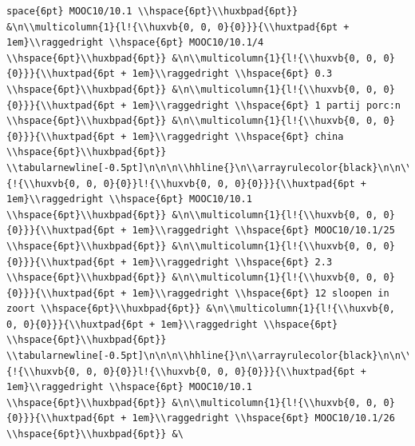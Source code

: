 \documentclass[11pt,preprint, authoryear]{elsarticle}
\numberwithin{equation}{section}
\numberwithin{figure}{section}
\numberwithin{table}{section}
\begin{document}
\begin{verbatim}
space{6pt} MOOC10/10.1 \\hspace{6pt}\\huxbpad{6pt}} &\n\\multicolumn{1}{l!{\\huxvb{0, 0, 0}{0}}}{\\huxtpad{6pt + 1em}\\raggedright \\hspace{6pt} MOOC10/10.1/4 \\hspace{6pt}\\huxbpad{6pt}} &\n\\multicolumn{1}{l!{\\huxvb{0, 0, 0}{0}}}{\\huxtpad{6pt + 1em}\\raggedright \\hspace{6pt} 0.3 \\hspace{6pt}\\huxbpad{6pt}} &\n\\multicolumn{1}{l!{\\huxvb{0, 0, 0}{0}}}{\\huxtpad{6pt + 1em}\\raggedright \\hspace{6pt} 1 partij porc:n \\hspace{6pt}\\huxbpad{6pt}} &\n\\multicolumn{1}{l!{\\huxvb{0, 0, 0}{0}}}{\\huxtpad{6pt + 1em}\\raggedright \\hspace{6pt} china \\hspace{6pt}\\huxbpad{6pt}} \\tabularnewline[-0.5pt]\n\n\n\\hhline{}\n\\arrayrulecolor{black}\n\n\\multicolumn{1}{!{\\huxvb{0, 0, 0}{0}}l!{\\huxvb{0, 0, 0}{0}}}{\\huxtpad{6pt + 1em}\\raggedright \\hspace{6pt} MOOC10/10.1 \\hspace{6pt}\\huxbpad{6pt}} &\n\\multicolumn{1}{l!{\\huxvb{0, 0, 0}{0}}}{\\huxtpad{6pt + 1em}\\raggedright \\hspace{6pt} MOOC10/10.1/25 \\hspace{6pt}\\huxbpad{6pt}} &\n\\multicolumn{1}{l!{\\huxvb{0, 0, 0}{0}}}{\\huxtpad{6pt + 1em}\\raggedright \\hspace{6pt} 2.3 \\hspace{6pt}\\huxbpad{6pt}} &\n\\multicolumn{1}{l!{\\huxvb{0, 0, 0}{0}}}{\\huxtpad{6pt + 1em}\\raggedright \\hspace{6pt} 12 sloopen in zoort \\hspace{6pt}\\huxbpad{6pt}} &\n\\multicolumn{1}{l!{\\huxvb{0, 0, 0}{0}}}{\\huxtpad{6pt + 1em}\\raggedright \\hspace{6pt}  \\hspace{6pt}\\huxbpad{6pt}} \\tabularnewline[-0.5pt]\n\n\n\\hhline{}\n\\arrayrulecolor{black}\n\n\\multicolumn{1}{!{\\huxvb{0, 0, 0}{0}}l!{\\huxvb{0, 0, 0}{0}}}{\\huxtpad{6pt + 1em}\\raggedright \\hspace{6pt} MOOC10/10.1 \\hspace{6pt}\\huxbpad{6pt}} &\n\\multicolumn{1}{l!{\\huxvb{0, 0, 0}{0}}}{\\huxtpad{6pt + 1em}\\raggedright \\hspace{6pt} MOOC10/10.1/26 \\hspace{6pt}\\huxbpad{6pt}} &\
\end{verbatim}
\end{document}
